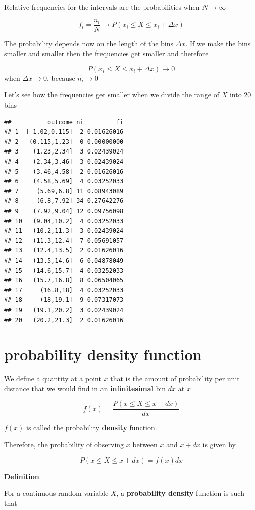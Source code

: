 \documentclass[
]{book}
\begin{document}
Relative frequencies for the intervals are the probabilities when \(N \rightarrow \infty\)

\[f_i=\frac{n_i}{N} \rightarrow P(x_i \leq X  \leq x_i + \Delta x)\]

The probability depends now on the length of the bins \(\Delta x\). If we make the bins smaller and smaller then the frequencies get smaller and therefore

\[P(x_i \leq X  \leq x_i + \Delta x) \rightarrow 0\] when \(\Delta x \rightarrow 0\), because \(n_i \rightarrow 0\)

Let's see how the frequencies get smaller when we divide the range of \(X\) into \(20\) bins

\begin{verbatim}
##          outcome ni         fi
## 1  [-1.02,0.115]  2 0.01626016
## 2   (0.115,1.23]  0 0.00000000
## 3    (1.23,2.34]  3 0.02439024
## 4    (2.34,3.46]  3 0.02439024
## 5    (3.46,4.58]  2 0.01626016
## 6    (4.58,5.69]  4 0.03252033
## 7     (5.69,6.8] 11 0.08943089
## 8     (6.8,7.92] 34 0.27642276
## 9    (7.92,9.04] 12 0.09756098
## 10   (9.04,10.2]  4 0.03252033
## 11   (10.2,11.3]  3 0.02439024
## 12   (11.3,12.4]  7 0.05691057
## 13   (12.4,13.5]  2 0.01626016
## 14   (13.5,14.6]  6 0.04878049
## 15   (14.6,15.7]  4 0.03252033
## 16   (15.7,16.8]  8 0.06504065
## 17     (16.8,18]  4 0.03252033
## 18     (18,19.1]  9 0.07317073
## 19   (19.1,20.2]  3 0.02439024
## 20   (20.2,21.3]  2 0.01626016
\end{verbatim}

\hypertarget{probability-density-function}{%
\section{probability density function}\label{probability-density-function}}

We define a quantity at a point \(x\) that is the amount of probability per unit distance that we would find in an \textbf{infinitesimal} bin \(dx\) at \(x\)

\[f(x)= \frac{P(x\leq X \leq x+dx)}{dx}\]

\(f(x)\) is called the probability \textbf{density} function.

Therefore, the probability of observing \(x\) between \(x\) and \(x+dx\)
is given by

\[P(x\leq X \leq x+dx)= f(x) dx\]

\textbf{Definition}

For a continuous random variable \(X\), a \textbf{probability density} function is such that
\end{document}
